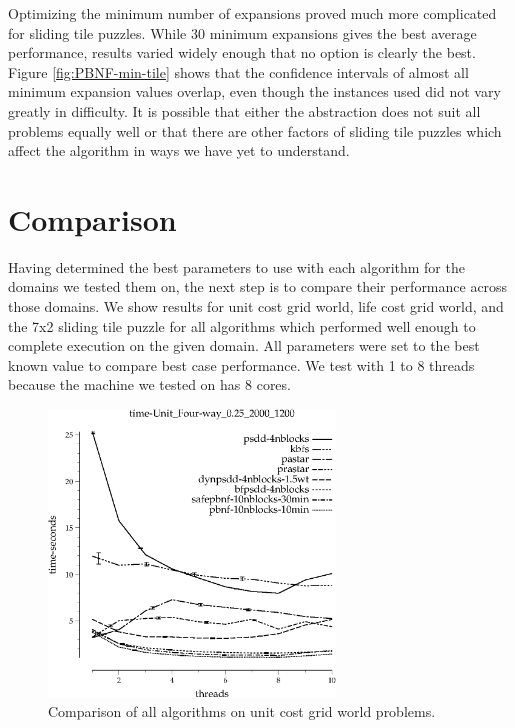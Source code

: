 \documentclass{article}
\begin{document}
Optimizing the minimum number of expansions proved much more complicated for sliding tile puzzles. While 30 minimum expansions gives the best average performance, results varied widely enough that no option is clearly the best. Figure \ref{fig:PBNF-min-tile} shows that the confidence intervals of almost all minimum expansion values overlap, even though the instances used did not vary greatly in difficulty. It is possible that either the abstraction does not suit all problems equally well or that there are other factors of sliding tile puzzles which affect the algorithm in ways we have yet to understand.
\section{Comparison}
Having determined the best parameters to use with each algorithm for the domains we tested them on, the next step is to compare their performance across those domains. We show results for unit cost grid world, life cost grid world, and the 7x2 sliding tile puzzle for all algorithms which performed well enough to complete execution on the given domain. All parameters were set to the best known value to compare best case performance. We test with 1 to 8 threads because the machine we tested on has 8 cores.

\begin{figure}[h!]
\includegraphics[width=3in]{../graphs/seth/time-Unit_Four-way_0.25_2000_1200.eps}
\caption{Comparison of all algorithms on unit cost grid world problems.}
\label{fig:comp-grid}
\end{figure}
\end{document}
